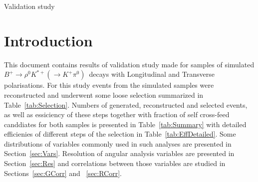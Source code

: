 \documentclass[12pt]{article}
\begin{document}
\begin{center}
{\large Validation study} \\ %
\clearpage
\end{center}
\section{Introduction}
This document contains results of validation study made for samples of simulated $B^+\to\rho^0K^{*+}(\to K^+\pi^0)$\ decays with Longitudinal and Transverse polarisations. 
For this study events from the simulated samples were reconstructed and underwent some loose selection summarized in Table~\ref{tab:Selection}.
Numbers of generated, reconstructed and selected events, as well as essiciency of these steps together with fraction of self cross-feed canddiates for both samples is presented in Table~\ref{tab:Summary} with detailed efficienies of different steps of the selection in Table~\ref{tab:EffDetailed}. Some distributions of variables commonly used in such analyses are presented in Section~\ref{sec:Vars}. Resolution of angular analysis variables are presented in Section~\ref{sec:Res} and correlations between those variables are studied in Sections~\ref{sec:GCorr} and ~\ref{sec:RCorr}.







\end{document}
